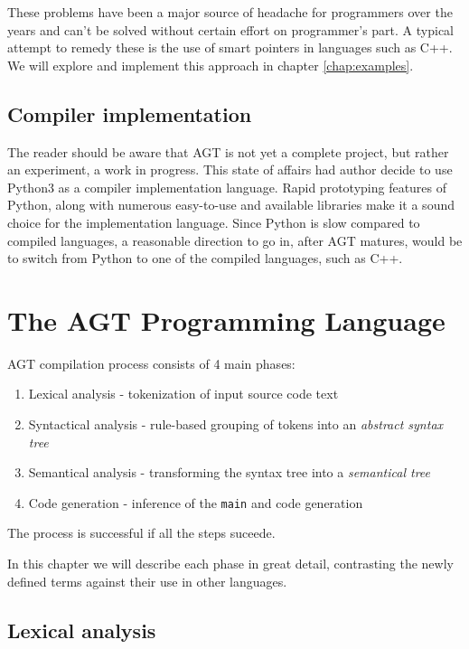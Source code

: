 \documentclass[times, utf8, diplomski]{fer}
\theoremstyle{definition}
\begin{document}
These problems have been a major source of headache for programmers over the years and can't be solved
without certain effort on programmer's part. A typical attempt to remedy these is the use of 
smart pointers in languages such as C++. We will explore and implement this approach in 
chapter \ref{chap:examples}.

\section{Compiler implementation}

The reader should be aware that AGT is not yet a complete project, but rather an experiment, 
a work in progress. This state of affairs had author decide to use Python3 as a compiler implementation
language. Rapid prototyping features of Python, along with numerous easy-to-use and available libraries
make it a sound choice for the implementation language. Since Python is slow compared to compiled
languages, a reasonable direction to go in, after AGT matures, would be to switch from Python
to one of the compiled languages, such as C++.

\chapter{The AGT Programming Language}\label{chap:indepth}

AGT compilation process consists of 4 main phases: 

\begin{enumerate}
\item Lexical analysis - tokenization of input source code text
\item Syntactical analysis - rule-based grouping of tokens into an \textit{abstract syntax tree}
\item Semantical analysis - transforming the syntax tree into a \textit{semantical tree}
\item Code generation - inference of the \texttt{main} and code generation
\end{enumerate}

The process is successful if all the steps suceede.

In this chapter we will describe each phase in great detail, contrasting the
newly defined terms against their use in other languages.

\section{Lexical analysis}
\end{document}
